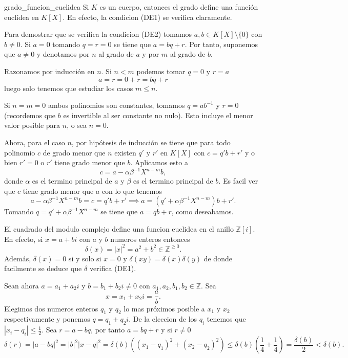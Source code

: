\begin{example}{}{grado_funcion_euclidea}
Si \(K\) es un cuerpo, entonces el grado define una función euclídea en \(K[X]\). En efecto, la condicion (DE1) se verifica claramente.

Para demostrar que se verifica la condicion (DE2) tomamos \(a, b \in K[X] \setminus \{0\}\) con \(b \neq 0\). Si \(a = 0\) tomando \(q = r = 0\) se tiene que \(a = bq + r\). Por tanto, suponemos que \(a \neq 0\) y denotamos por \(n\) al grado de \(a\) y por \(m\) al grado de \(b\). 

Razonamos por inducción en \(n\). Si \(n < m\) podemos tomar \(q = 0\) y \(r = a\)
\[
a = r = 0 + r = bq + r
\]
luego solo tenemos que estudiar los casos \(m \leq n\).

Si \(n = m = 0\) ambos polinomios son constantes, tomamos \(q = ab^{-1}\) y \(r = 0\) (recordemos que \(b\) es invertible al ser constante no nulo). Esto incluye el menor valor posible para \(n\), o sea \(n = 0\). 

Ahora, para el caso \(n\), por hipótesis de inducción se tiene que para todo polinomio \(c\) de grado menor que \(n\) existen \(q'\) y \(r'\) en \(K[X]\) con \(c = q'b + r'\) y o bien \(r' = 0\) o \(r'\) tiene grado menor que \(b\). Aplicamos esto a
\[
c = a - \alpha\beta^{-1}X^{n-m}b,
\]
donde \(\alpha\) es el termino principal de \(a\) y \(\beta\) es el termino principal de \(b\). Es facil ver que \(c\) tiene grado menor que \(a\) con lo que tenemos
\[
a - \alpha\beta^{-1}X^{n-m}b = c = q'b + r' \implies a = (q' + \alpha\beta^{-1}X^{n-m})b + r'.
\]
Tomando \(q = q' + \alpha\beta^{-1}X^{n-m}\) se tiene que \(a = qb + r\), como deseabamos.
\end{example}

\begin{example}{}{}
El cuadrado del modulo complejo define una funcion euclidea en el anillo \(\mathbb{Z}[i]\). En efecto, si \(x = a + bi\) con \(a\) y \(b\) numeros enteros entonces 
\[
\delta(x) = |x|^2 = a^2 + b^2 \in \mathbb{Z}^{\geq 0}.
\]
Además, \(\delta(x) = 0\) si y solo si \(x = 0\) y \(\delta(xy) = \delta(x)\delta(y)\) de donde facilmente se deduce que \(\delta\) verifica (DE1).

Sean ahora \(a = a_1 + a_2i\) y \(b = b_1 + b_2i \neq 0\) con \(a_1, a_2, b_1, b_2 \in \mathbb{Z}\). Sea
\[
x = x_1 + x_2i = \frac{a}{b}. %
\]
Elegimos dos numeros enteros \(q_1\) y \(q_2\) lo mas próximos posible a \(x_1\) y \(x_2\) respectivamente y ponemos \(q = q_1 + q_2i\). De la eleccion de los \(q_i\) tenemos que \(|x_i - q_i| \leq \frac{1}{2}\). Sea \(r = a - bq\), por tanto \(a = bq + r\) y si \(r \neq 0\)
\[
\delta(r) = |a - bq|^2 = |b|^2|x - q|^2 = \delta(b)((x_1 - q_1)^2 + (x_2 - q_2)^2) \leq \delta(b)\left(\frac{1}{4} + \frac{1}{4}\right) = \frac{\delta(b)}{2} < \delta(b).
\]
\end{example}

